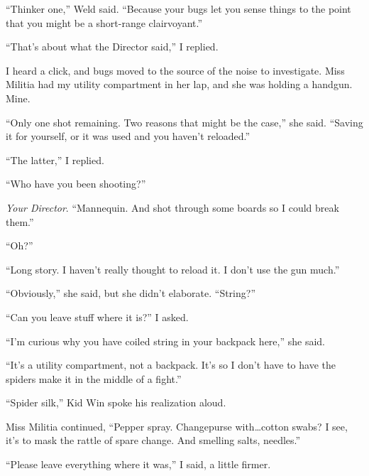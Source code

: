 ``Thinker one,'' Weld said.  ``Because your bugs let you sense things to the point that you might be a short-range clairvoyant.''



``That's about what the Director said,'' I replied.



I heard a click, and bugs moved to the source of the noise to investigate.  Miss Militia had my utility compartment in her lap, and she was holding a handgun.  Mine.



``Only one shot remaining.  Two reasons that might be the case,'' she said.  ``Saving it for yourself, or it was used and you haven't reloaded.''



``The latter,'' I replied.



``Who have you been shooting?''



\emph{Your Director}.  ``Mannequin.  And shot through some boards so I could break them.''



``Oh?''



``Long story.  I haven't really thought to reload it.  I don't use the gun much.''



``Obviously,'' she said, but she didn't elaborate.  ``String?''



``Can you leave stuff where it is?''  I asked.



``I'm curious why you have coiled string in your backpack here,'' she said.



``It's a utility compartment, not a backpack.  It's so I don't have to have the spiders make it in the middle of a fight.''



``Spider silk,'' Kid Win spoke his realization aloud.



Miss Militia continued, ``Pepper spray.  Changepurse with\ldots cotton swabs?  I see, it's to mask the rattle of spare change.  And smelling salts, needles.''



``Please leave everything where it was,'' I said, a little firmer.



